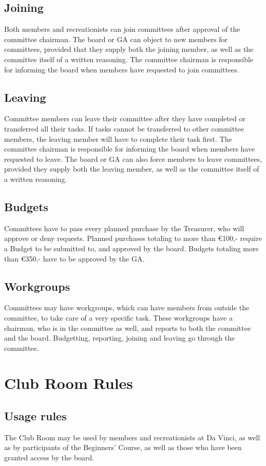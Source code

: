 \documentclass[a4paper]{article}
\begin{document}
\subsection{Joining}
Both members and recreationists can join committees after approval of the committee chairman. The board or GA can object to new members for committees, provided that they supply both the joining member, as well as the committee itself of a written reasoning. The committee chairman is responsible for informing the board when members have requested to join committees.

\subsection{Leaving}
Committee members can leave their committee after they have completed or transferred all their tasks. If tasks cannot be transferred to other committee members, the leaving member will have to complete their task first. The committee chairman is responsible for informing the board when members have requested to leave. The board or GA can also force members to leave committees, provided they supply both the leaving member, as well as the committee itself of a written reasoning.

\subsection{Budgets}
Committees have to pass every planned purchase by the Treasurer, who will approve or deny requests. Planned purchases totaling to more than €100,- require a Budget to be submitted to, and approved by the board. Budgets totaling more than €350,- have to be approved by the GA.

\subsection{Workgroups}
Committees may have workgroups, which can have members from outside the committee, to take care of a very specific task. These workgroups have a chairman, who is in the committee as well, and reports to both the committee and the board. Budgetting, reporting, joining and leaving go through the committee.

\section{Club Room Rules}
\subsection{Usage rules}
The Club Room may be used by members and recreationists at Da Vinci, as well as by participants of the Beginners' Course, as well as those who have been granted access by the board. 
\end{document}
